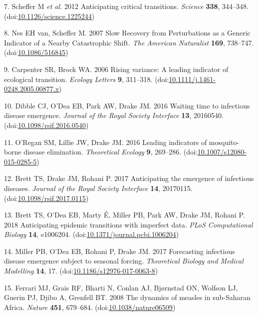 \documentclass[3p]{elsarticle} %
\begin{document}
\leavevmode\hypertarget{ref-Scheffer2012}{}%
7. Scheffer M \emph{et al.} 2012 Anticipating critical transitions.
\emph{Science} \textbf{338}, 344--348.
(doi:\href{https://doi.org/10.1126/science.1225244}{10.1126/science.1225244})

\leavevmode\hypertarget{ref-VanNes2007}{}%
8. Nes EH van, Scheffer M. 2007 Slow Recovery from Perturbations as a
Generic Indicator of a Nearby Catastrophic Shift. \emph{The American
Naturalist} \textbf{169}, 738--747.
(doi:\href{https://doi.org/10.1086/516845}{10.1086/516845})

\leavevmode\hypertarget{ref-Carpenter2006}{}%
9. Carpenter SR, Brock WA. 2006 Rising variance: A leading indicator of
ecological transition. \emph{Ecology Letters} \textbf{9}, 311--318.
(doi:\href{https://doi.org/10.1111/j.1461-0248.2005.00877.x}{10.1111/j.1461-0248.2005.00877.x})

\leavevmode\hypertarget{ref-Dibble2016}{}%
10. Dibble CJ, O'Dea EB, Park AW, Drake JM. 2016 Waiting time to
infectious disease emergence. \emph{Journal of the Royal Society
Interface} \textbf{13}, 20160540.
(doi:\href{https://doi.org/10.1098/rsif.2016.0540}{10.1098/rsif.2016.0540})

\leavevmode\hypertarget{ref-ORegan2016}{}%
11. O'Regan SM, Lillie JW, Drake JM. 2016 Leading indicators of
mosquito-borne disease elimination. \emph{Theoretical Ecology}
\textbf{9}, 269--286.
(doi:\href{https://doi.org/10.1007/s12080-015-0285-5}{10.1007/s12080-015-0285-5})

\leavevmode\hypertarget{ref-Brett2017}{}%
12. Brett TS, Drake JM, Rohani P. 2017 Anticipating the emergence of
infectious diseases. \emph{Journal of the Royal Society Interface}
\textbf{14}, 20170115.
(doi:\href{https://doi.org/10.1098/rsif.2017.0115}{10.1098/rsif.2017.0115})

\leavevmode\hypertarget{ref-Brett2018}{}%
13. Brett TS, O'Dea EB, Marty É, Miller PB, Park AW, Drake JM, Rohani P.
2018 Anticipating epidemic transitions with imperfect data. \emph{PLoS
Computational Biology} \textbf{14}, e1006204.
(doi:\href{https://doi.org/10.1371/journal.pcbi.1006204}{10.1371/journal.pcbi.1006204})

\leavevmode\hypertarget{ref-Miller2017}{}%
14. Miller PB, O'Dea EB, Rohani P, Drake JM. 2017 Forecasting infectious
disease emergence subject to seasonal forcing. \emph{Theoretical Biology
and Medical Modelling} \textbf{14}, 17.
(doi:\href{https://doi.org/10.1186/s12976-017-0063-8}{10.1186/s12976-017-0063-8})

\leavevmode\hypertarget{ref-Ferrari2008}{}%
15. Ferrari MJ, Grais RF, Bharti N, Conlan AJ, Bjørnstad ON, Wolfson LJ,
Guerin PJ, Djibo A, Grenfell BT. 2008 The dynamics of measles in
sub-Saharan Africa. \emph{Nature} \textbf{451}, 679--684.
(doi:\href{https://doi.org/10.1038/nature06509}{10.1038/nature06509})
\end{document}
